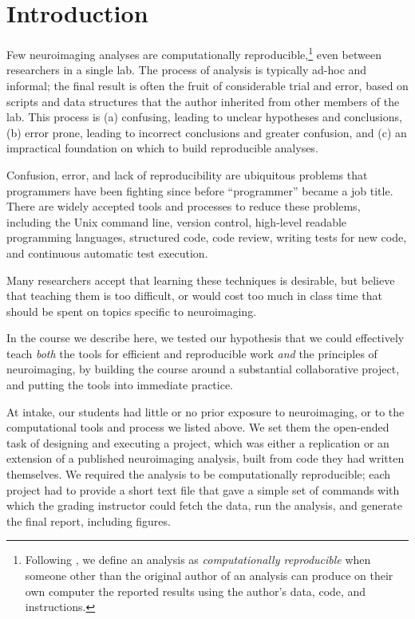 \section{Introduction}

Few neuroimaging analyses are computationally reproducible,\footnote{Following
\citet{buckheit1995wavelab}, we define an analysis as \emph{computationally
reproducible} when someone other than the original author of an analysis can
produce on their own computer the reported results using the author's data,
code, and instructions.}
even between researchers in a single lab.
The process of analysis is typically ad-hoc and informal; the final result
is often the fruit of considerable trial and error, based
on scripts and data structures that the author inherited from other members of
the lab.
This process is
(a) confusing, leading to unclear hypotheses and conclusions,
(b) error prone, leading to incorrect conclusions and greater confusion,
and (c) an impractical foundation on which to build reproducible analyses.

Confusion, error, and lack of reproducibility are ubiquitous problems that
programmers have been fighting since before ``programmer'' became a job title.
There are widely accepted tools and processes to reduce these problems,
including the Unix command line, version control, high-level readable
programming languages, structured code, code review, writing tests for new
code, and continuous automatic test execution.

Many researchers accept that learning these techniques is desirable, but
believe that teaching them is too difficult, or would cost too much in class
time that should be spent on topics specific to neuroimaging.

In the course we describe here, we tested our hypothesis that we could
effectively teach \emph{both} the tools for efficient and reproducible work
\emph{and} the principles of neuroimaging, by building the course around a
substantial collaborative project, and putting the tools into immediate
practice.

At intake, our students had little or no prior exposure to neuroimaging,
or to the computational tools and process we listed above.  We set them the
open-ended task of designing and executing a project, which was either a
replication or an extension of a published neuroimaging analysis, built from
code they had written themselves.  We required the analysis to be computationally
reproducible; each project had to provide a short text file that gave a
simple set of commands with which the grading instructor could fetch the data,
run the analysis, and generate the final report, including figures.

